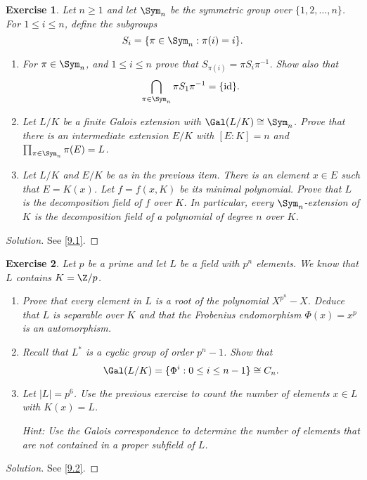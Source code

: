 \documentclass[a4paper,10pt,reqno]{amsart}
\newtheorem{ex}{Exercise}[section]
\newenvironment{sol}
  {\renewcommand\qedsymbol{$\blacksquare$}\begin{proof}[Solution]}
  {\end{proof}}
\begin{document}
\begin{ex}
\label{8.3}
Let $n \geq 1$ and let $\Sym_n$ be the symmetric group over $\{1, 2, \ldots, n \}$. For $1 \leq i \leq n$, define the subgroups
\[
S_i = \{ \pi \in \Sym_n : \pi(i) = i \}.
\]
\begin{enumerate}[label=(\roman*)]
\item For $\pi \in \Sym_n$, and $1 \leq i \leq n$ prove that $S_{\pi(i)} = \pi S_i\pi^{-1}$. Show also that
\[
\bigcap_{\pi \in \Sym_n} \pi S_1\pi^{-1} = \{ \mathrm{id} \}.
\]
\item Let $L/K$ be a finite Galois extension with $\Gal(L/K) \cong \Sym_n$. Prove that there is an intermediate extension $E/K$ with $[E:K] = n$ and $\prod_{\pi \in \Sym_n} \pi(E) = L$.
\item Let $L/K$ and $E/K$ be as in the previous item. There is an element $x \in E$ such that $E = K(x)$. Let $f = f(x,K)$ be its minimal polynomial. Prove that $L$ is the decomposition field of $f$ over $K$. In particular, every $\Sym_n$-extension of $K$ is the decomposition field of a polynomial of degree $n$ over $K$.
\end{enumerate}

\end{ex}

\begin{sol}
    See \cref{9.1}.
\end{sol}

\begin{ex}
\label{8.4}
    Let $p$ be a prime and let $L$ be a field with $p^n$ elements. We know that $L$ contains $K = \Z/p$.
\begin{enumerate}[label=(\roman*)]
\item Prove that every element in $L$ is a root of the polynomial $X^{p^n} - X$. Deduce that $L$ is separable over $K$ and that the Frobenius endomorphism $\Phi(x) = x^p$ is an automorphism.
\item Recall that $L^{\ast}$ is a cyclic group of order $p^n-1$. Show that 
$$\Gal(L/K) = \{ \Phi^i : 0 \leq i \leq n-1 \} \cong C_n.$$
\item Let $|L| = p^6$. Use the previous exercise to count the number of elements $x \in L$ with $K(x) = L$.

\noindent \textit{Hint:} Use the Galois correspondence to determine the number of elements that are not contained in a proper subfield of $L$.
\end{enumerate} 
\end{ex}

\begin{sol}
    See \cref{9.2}.
\end{sol}
\end{document}

